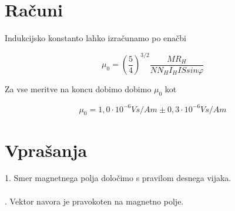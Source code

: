 \documentclass[a4paper]{report}
\begin{document}
\section*{Računi}

Indukcijsko konstanto lahko izračunamo po enačbi

\[\mu_0 =\left(\frac{5}{4}\right)^{3/2}\frac{MR_H}{NN_HI_HISsin\varphi}\]

\noindent Za vse meritve na koncu dobimo dobimo $\mu_0$ kot

\[\mu_0=1,0\cdot10^{-6}Vs/Am \pm 0,3\cdot10^{-6}Vs/Am \]

\section*{Vprašanja}
1. Smer magnetnega polja določimo s pravilom desnega vijaka.\\
\\
. Vektor navora je pravokoten na magnetno polje.
\end{document}
